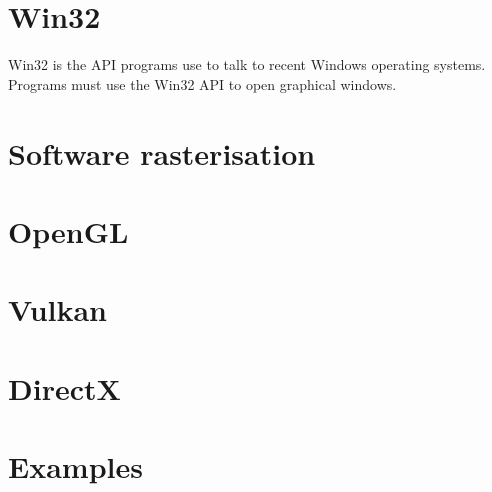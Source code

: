 \documentclass{article}
\begin{document}
\section{Win32}
\label{sec:win32}

Win32 is the API programs use to talk to recent Windows operating systems.
Programs must use the Win32 API to open graphical windows.


\section{Software rasterisation}
\label{sec:software-rasterisation}


\section{OpenGL}
\label{sec:opengl}


\section{Vulkan}
\label{sec:vulkan}


\section{DirectX}
\label{sec:directx}


\section{Examples}
\label{sec:examples}
\end{document}
